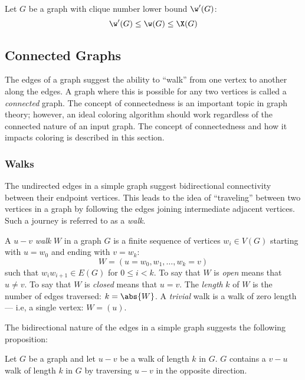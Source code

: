 \begin{proposition}
  \label{prop:clique}
  Let \(G\) be a graph with clique number lower bound \(\w'(G)\):
  \[\w'(G)\le\w(G)\le\X(G)\]
\end{proposition}

\subsection{Connected Graphs}\label{sec:sub:connected}

The edges of a graph suggest the ability to ``walk'' from one vertex to another along the edges.  A graph where this
is possible for any two vertices is called a \emph{connected} graph.  The concept of connectedness is an
important topic in graph theory; however, an ideal coloring algorithm should work regardless of the connected
nature of an input graph.  The concept of connectedness and how it impacts coloring is described in this section.

\subsubsection{Walks}\label{sec:sub:sub:walks}

The undirected edges in a simple graph suggest bidirectional connectivity between their endpoint vertices.  This
leads to the idea of ``traveling'' between two vertices in a graph by following the edges joining intermediate
adjacent vertices.  Such a journey is referred to as a \emph{walk}.

A \(u-v\) \emph{walk} \(W\) in a graph \(G\) is a finite sequence of vertices \(w_i\in V(G)\) starting with
\(u=w_0\) and ending with \(v=w_k\):
\[W=(u=w_0,w_1,\ldots,w_k=v)\]
such that \(w_iw_{i+1}\in E(G)\) for \(0\le i<k\).  To say that \(W\) is \emph{open} means that \(u\ne v\).  To say
that \(W\) is \emph{closed} means that \(u=v\).  The \emph{length} \(k\) of \(W\) is the number of edges traversed:
\(k=\abs{W}\).  A \emph{trivial} walk is a walk of zero length --- i.e, a single vertex: \(W=(u)\).

The bidirectional nature of the edges in a simple graph suggests the following proposition:

\begin{proposition}
  Let \(G\) be a graph and let \(u-v\) be a walk of length \(k\) in \(G\).  \(G\) contains a \(v-u\) walk of length
  \(k\) in \(G\) by traversing \(u-v\) in the opposite direction.
\end{proposition}

